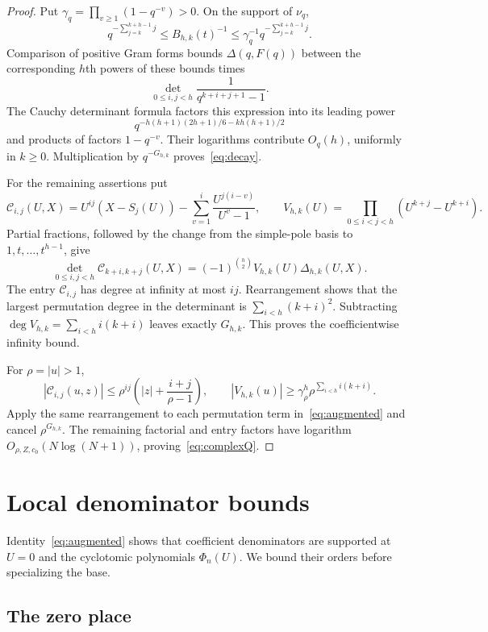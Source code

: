 \documentclass[12pt]{article}
\theoremstyle{remark}
\begin{document}
\begin{proof}
Put $\gamma_q=\prod_{v\geq1}(1-q^{-v})>0$. On the support of $\nu_q$,
\[
q^{-\sum_{j=k}^{k+h-1}j}\leq B_{h,k}(t)^{-1}
\leq\gamma_q^{-1}q^{-\sum_{j=k}^{k+h-1}j}.
\]
Comparison of positive Gram forms bounds $\Delta(q,F(q))$ between the
corresponding $h$th powers of these bounds times
\[
\det_{0\leq i,j<h}\frac1{q^{k+i+j+1}-1}.
\]
The Cauchy determinant formula factors this expression into its leading power
\[q^{-h(h+1)(2h+1)/6-kh(h+1)/2}\]
and products of factors $1-q^{-v}$.
Their logarithms contribute $O_q(h)$, uniformly in $k\geq0$.
Multiplication by $q^{-G_{h,k}}$ proves~\eqref{eq:decay}.

For the remaining assertions put
\[
\mathcal C_{i,j}(U,X)=U^{ij}(X-S_j(U))-
\sum_{v=1}^{i}\frac{U^{j(i-v)}}{U^v-1},\qquad
V_{h,k}(U)=\prod_{0\leq i<j<h}(U^{k+j}-U^{k+i}).
\]
Partial fractions, followed by the change from the simple-pole basis to
$1,t,\ldots,t^{h-1}$, give
\begin{equation}\label{eq:augmented}
\det_{0\leq i,j<h}\mathcal C_{k+i,k+j}(U,X)
=(-1)^{\binom h2}V_{h,k}(U)\Delta_{h,k}(U,X).
\end{equation}
The entry $\mathcal C_{i,j}$ has degree at infinity at most $ij$. Rearrangement shows
that the largest permutation degree in the determinant is
$\sum_{i<h}(k+i)^2$. Subtracting
$\deg V_{h,k}=\sum_{i<h}i(k+i)$ leaves exactly $G_{h,k}$.
This proves the coefficientwise infinity bound.

For $\rho=|u|>1$,
\[
|\mathcal C_{i,j}(u,z)|\leq\rho^{ij}\left(|z|+\frac{i+j}{\rho-1}\right),\qquad
|V_{h,k}(u)|\geq\gamma_\rho^h\rho^{\sum_{i<h}i(k+i)}.
\]
Apply the same rearrangement to each permutation term in~\eqref{eq:augmented}
and cancel $\rho^{G_{h,k}}$. The remaining factorial and entry factors have
logarithm $O_{\rho,Z,c_0}(N\log(N+1))$, proving~\eqref{eq:complexQ}.
\end{proof}

\section{Local denominator bounds}\label{sec:arithmetic}

Identity~\eqref{eq:augmented} shows that coefficient denominators are supported
at $U=0$ and the cyclotomic polynomials $\Phi_n(U)$. We bound their orders
before specializing the base.

\subsection{The zero place}
\end{document}
